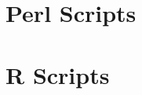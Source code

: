 \documentclass{book}
\begin{document}
\chapter{Perl Scripts}
\label{sec:perl-scripts}



\chapter{R Scripts}
\label{sec:r-scripts}


\end{document}
